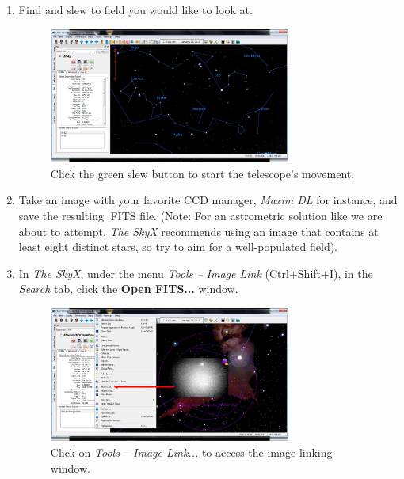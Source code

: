 \documentclass[12pt,twoside,a4paper]{report}
\begin{document}
\begin{enumerate}
 \item Find and slew to field you would like to look at.

 \begin{figure}[ht]
 \centering
    \includegraphics[width=0.75\textwidth]{documentation_images/moving_telescope.png}
    \caption{\label{fig:moving_telescope}Click the green slew button to start the telescope's movement.}
\end{figure}

 \item \label{2} Take an image with your favorite CCD manager, \emph{Maxim DL} for instance, and save the resulting .FITS file. (Note: For an astrometric solution like we are about to attempt, \emph{The SkyX} recommends using an image that contains at least eight distinct stars, so try to aim for a well-populated field).

 \item In \emph{The SkyX}, under the menu \emph{Tools -- Image Link} (Ctrl+Shift+I), in the \emph{Search} tab, click the \textbf{Open FITS...} window.

  \begin{figure}[ht]
 \centering
    \includegraphics[width=0.75\textwidth]{documentation_images/tools_menu_1_1.png}
    \caption{ \label{fig:tools_menu}Click on \emph{Tools -- Image Link...} to access the image linking window.}
  \end{figure}


\end{enumerate}
\end{document}
